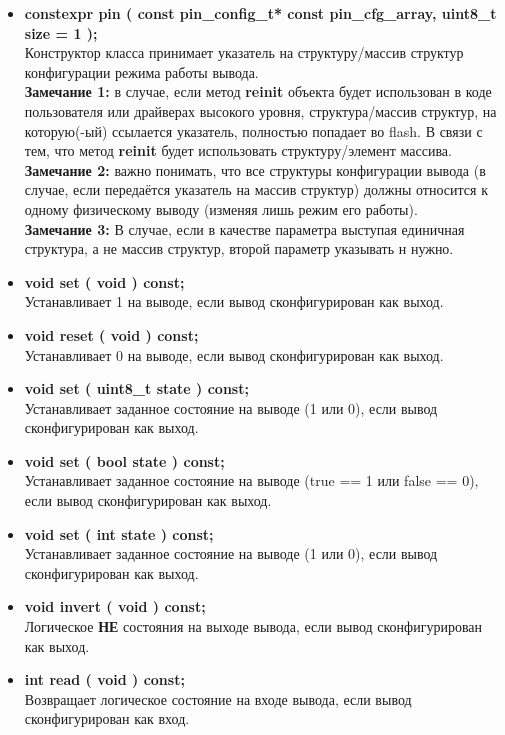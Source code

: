 \begin{itemize}
	\item \textbf{constexpr pin ( const pin\_config\_t* const pin\_cfg\_array,  uint8\_t size = 1 );}\\Конструктор класса принимает указатель на структуру/массив структур конфигурации режима работы  вывода.\\\textbf{Замечание 1: } в случае, если метод \textbf{reinit} объекта будет использован в коде пользователя или драйверах высокого уровня, структура/массив структур, на которую(-ый) ссылается указатель, полностью попадает во flash. В связи с тем, что метод \textbf{reinit} будет использовать структуру/элемент массива.
	\\\textbf{Замечание 2: }важно понимать, что все структуры конфигурации вывода (в случае, если передаётся указатель на массив структур) должны относится к одному физическому выводу (изменяя лишь режим его работы).
	\\\textbf{Замечание 3: }В случае, если в качестве параметра выступая единичная структура, а не массив структур, второй параметр указывать н нужно.
	\item \textbf{void	set		( void ) const;}\\Устанавливает 1 на выводе, если вывод сконфигурирован как выход.
	\item \textbf{void	reset	( void ) const;}\\Устанавливает 0 на выводе, если вывод сконфигурирован как выход.
	\item \textbf{void	set		( uint8\_t state ) const;}\\Устанавливает заданное состояние на выводе (1 или 0), если вывод сконфигурирован как выход.
	\item \textbf{void	set		( bool state ) const;}\\Устанавливает заданное состояние на выводе (true == 1 или false == 0), если вывод сконфигурирован как выход.
	\item \textbf{void	set		( int state ) const;}\\Устанавливает заданное состояние на выводе (1 или 0), если вывод сконфигурирован как выход.
	\item \textbf{void	invert	( void ) const;}\\Логическое \textbf{НЕ} состояния на выходе вывода, если вывод сконфигурирован как выход.
	\item \textbf{int		read	( void ) const;}\\Возвращает логическое состояние на входе вывода, если вывод сконфигурирован как вход.

\end{itemize}
